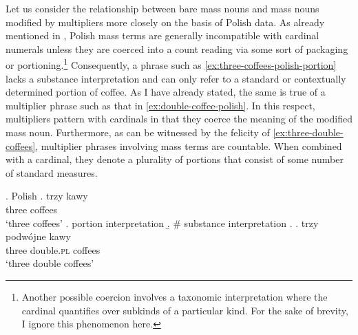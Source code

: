 Let us consider the relationship between bare mass nouns and mass nouns modified by multipliers more closely on the basis of Polish data. As already mentioned in  , Polish mass terms are generally incompatible with cardinal numerals unless they are coerced into a count reading via some sort of packaging or portioning.\footnote{Another possible coercion involves a taxonomic interpretation where the cardinal quantifies over subkinds of a particular kind. For the sake of brevity, I ignore this phenomenon here.} Consequently, a phrase such as \ref{ex:three-coffees-polish-portion} lacks a substance interpretation and can only refer to a standard or contextually determined portion of coffee. As I have already stated, the same is true of a multiplier phrase such as that in \ref{ex:double-coffee-polish}. In this respect, multipliers pattern with cardinals in that they coerce the meaning of the modified mass noun. Furthermore, as can be witnessed by the felicity of \ref{ex:three-double-coffees}, multiplier phrases involving mass terms are countable. When combined with a cardinal, they denote a plurality of portions that consist of some number of standard measures.

\ex. Polish\label{ex:double-coffee-polish-portion}
\ag. trzy kawy\\
three coffees\\
`three coffees'\label{ex:three-coffees-polish-portion}
\a. portion interpretation
\b. \# substance interpretation
\z.
\bg. trzy podwójne kawy\\
three double\textsc{.pl} coffees\\
`three double coffees'\label{ex:three-double-coffees}

